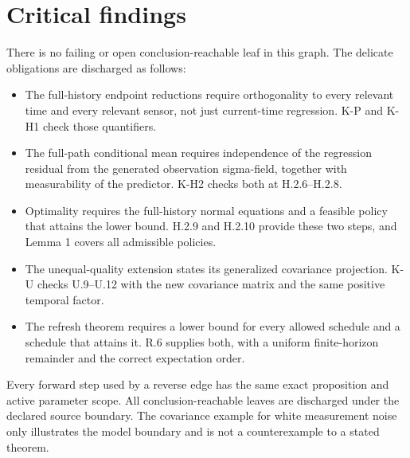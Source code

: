 \documentclass[11pt,letterpaper]{article}
\begin{document}
\section{Critical findings}
There is no failing or open conclusion-reachable leaf in this graph. The delicate obligations are discharged as follows:
\begin{itemize}
\item The full-history endpoint reductions require orthogonality to every relevant time and every relevant sensor, not just current-time regression. K-P and K-H1 check those quantifiers.
\item The full-path conditional mean requires independence of the regression residual from the generated observation sigma-field, together with measurability of the predictor. K-H2 checks both at H.2.6--H.2.8.
\item Optimality requires the full-history normal equations and a feasible policy that attains the lower bound. H.2.9 and H.2.10 provide these two steps, and Lemma 1 covers all admissible policies.
\item The unequal-quality extension states its generalized covariance projection. K-U checks U.9--U.12 with the new covariance matrix and the same positive temporal factor.
\item The refresh theorem requires a lower bound for every allowed schedule and a schedule that attains it. R.6 supplies both, with a uniform finite-horizon remainder and the correct expectation order.
\end{itemize}
Every forward step used by a reverse edge has the same exact proposition and active parameter scope. All conclusion-reachable leaves are discharged under the declared source boundary. The covariance example for white measurement noise only illustrates the model boundary and is not a counterexample to a stated theorem.
\end{document}
